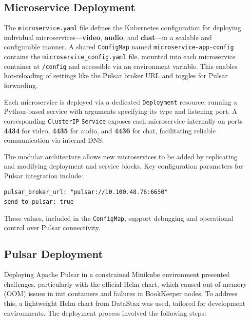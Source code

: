 \subsection{Microservice Deployment}
The \texttt{microservice.yaml} file defines the Kubernetes configuration for deploying individual microservices—\textbf{video}, \textbf{audio}, and \textbf{chat}—in a scalable and configurable manner. A shared \texttt{ConfigMap} named \texttt{microservice-app-config} contains the \texttt{microservice\_config.yaml} file, mounted into each microservice container at \texttt{/config} and accessible via an environment variable. This enables hot-reloading of settings like the Pulsar broker URL and toggles for Pulsar forwarding.

Each microservice is deployed via a dedicated \texttt{Deployment} resource, running a Python-based service with arguments specifying its type and listening port. A corresponding \texttt{ClusterIP} \texttt{Service} exposes each microservice internally on ports \textbf{4434} for video, \textbf{4435} for audio, and \textbf{4436} for chat, facilitating reliable communication via internal DNS.

The modular architecture allows new microservices to be added by replicating and modifying deployment and service blocks. Key configuration parameters for Pulsar integration include:

\begin{lstlisting}[breaklines=true,basicstyle=\small\ttfamily,frame=single]
pulsar_broker_url: "pulsar://10.100.48.76:6650"
send_to_pulsar: true
\end{lstlisting}

These values, included in the \texttt{ConfigMap}, support debugging and operational control over Pulsar connectivity.

\subsection{Pulsar Deployment}
Deploying Apache Pulsar in a constrained Minikube environment presented challenges, particularly with the official Helm chart, which caused out-of-memory (OOM) issues in init containers and failures in BookKeeper nodes. To address this, a lightweight Helm chart from DataStax was used, tailored for development environments. The deployment process involved the following steps:

